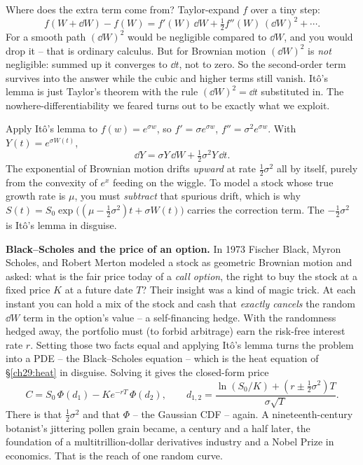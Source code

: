 \begin{whybox}
Where does the extra term come from? Taylor-expand $f$ over a tiny step:
\[
  f(W+\dd W) - f(W)
  = f'(W)\,\dd W + \tfrac12 f''(W)\,(\dd W)^2 + \cdots.
\]
For a smooth path $(\dd W)^2$ would be negligible compared to $\dd W$, and you
would drop it -- that is ordinary calculus. But for Brownian motion $(\dd W)^2$ is
\emph{not} negligible: summed up it converges to $\dd t$, not to zero. So the
second-order term survives into the answer while the cubic and higher terms still
vanish. It\^o's lemma is just Taylor's theorem with the rule $(\dd W)^2=\dd t$
substituted in. The nowhere-differentiability we feared turns out to be exactly
what we exploit.
\end{whybox}

\begin{example}
\label{ch29:ex-gbm}
Apply It\^o's lemma to $f(w)=e^{\sigma w}$, so $f'=\sigma e^{\sigma w}$,
$f''=\sigma^2 e^{\sigma w}$. With $Y(t)=e^{\sigma W(t)}$,
\[
  \dd Y = \sigma Y\,\dd W + \tfrac12\sigma^2 Y\,\dd t.
\]
The exponential of Brownian motion drifts \emph{upward} at rate
$\tfrac12\sigma^2$ all by itself, purely from the convexity of $e^x$ feeding on
the wiggle. To model a stock whose true growth rate is $\mu$, you must
\emph{subtract} that spurious drift, which is why
$S(t)=S_0\exp\big((\mu-\tfrac12\sigma^2)t+\sigma W(t)\big)$ carries the correction
term. The $-\tfrac12\sigma^2$ is It\^o's lemma in disguise.
\end{example}

\begin{applicationbox}
\textbf{Black--Scholes and the price of an option.} In 1973 Fischer Black, Myron
Scholes, and Robert Merton modeled a stock as geometric Brownian motion and asked:
what is the fair price today of a \emph{call option}, the right to buy the stock
at a fixed price $K$ at a future date $T$? Their insight was a kind of magic
trick. At each instant you can hold a mix of the stock and cash that
\emph{exactly cancels} the random $\dd W$ term in the option's value -- a
self-financing hedge. With the randomness hedged away, the portfolio must (to
forbid arbitrage) earn the risk-free interest rate $r$. Setting those two facts
equal and applying It\^o's lemma turns the problem into a PDE -- the
Black--Scholes equation -- which is the heat equation of \S\ref{ch29:heat} in
disguise. Solving it gives the closed-form price
\[
  C = S_0\,\Phi(d_1) - K e^{-rT}\,\Phi(d_2),
  \qquad
  d_{1,2} = \frac{\ln(S_0/K) + (r \pm \tfrac12\sigma^2)T}{\sigma\sqrt T}.
\]
There is that $\tfrac12\sigma^2$ and that $\Phi$ -- the Gaussian CDF -- again. A
nineteenth-century botanist's jittering pollen grain became, a century and a half
later, the foundation of a multitrillion-dollar derivatives industry and a Nobel
Prize in economics. That is the reach of one random curve.
\end{applicationbox}

